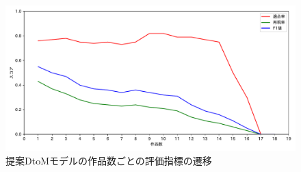 \documentclass[submit,ses,noauthor]{ipsj}
\begin{document}
\begin{table}[t]
  \caption{従来BtoDモデルと提案BtoDモデル（L=1）の精度比較}
  \label{tab:btod-model-comp}
  \vspace{1mm}
  \centering
   \vspace{-2mm}
\end{table}


\begin{figure}[t]
	\centering
	\includegraphics[width=1.0\linewidth]{Okamoto_fig/dtom-lines2.pdf}
	\caption{提案DtoMモデルの作品数ごとの評価指標の遷移}
	\label{fig:dtom-lines}
  \vspace{-2mm}
\end{figure}
\end{document}
